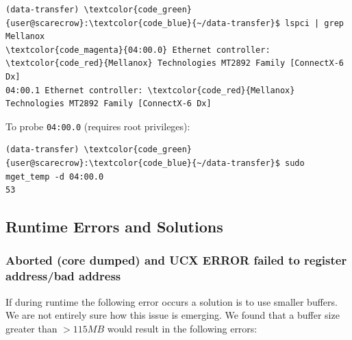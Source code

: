 \documentclass[a4paper,onecolumn]{article}
\begin{document}
\begin{Verbatim}[commandchars=\\\{\}]
(data-transfer) \textcolor{code_green}{user@scarecrow}:\textcolor{code_blue}{~/data-transfer}$ lspci | grep Mellanox
\textcolor{code_magenta}{04:00.0} Ethernet controller: \textcolor{code_red}{Mellanox} Technologies MT2892 Family [ConnectX-6 Dx]
04:00.1 Ethernet controller: \textcolor{code_red}{Mellanox} Technologies MT2892 Family [ConnectX-6 Dx]
\end{Verbatim}

\vspace{5mm} %
To probe \verb|04:00.0| (requires root privileges):

\begin{Verbatim}[commandchars=\\\{\}]
(data-transfer) \textcolor{code_green}{user@scarecrow}:\textcolor{code_blue}{~/data-transfer}$ sudo mget_temp -d 04:00.0
53
\end{Verbatim}


\subsection{Runtime Errors and Solutions}

\subsubsection{Aborted (core dumped) and UCX ERROR failed to register address/bad address}

If during runtime the following error occurs a solution is to use smaller buffers. We are not entirely sure how this issue is emerging. We found that a buffer size greater than \textcolor{code_magenta}{$>115MB$} would result in the following errors:
\end{document}
